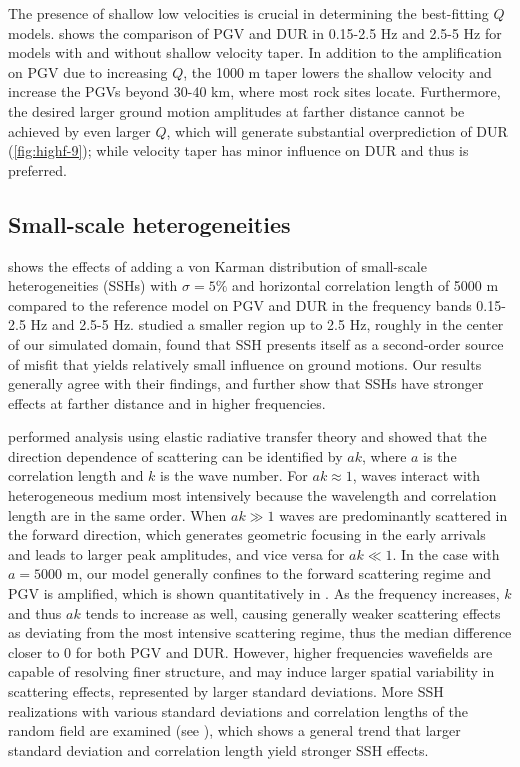 The presence of shallow low velocities is crucial in determining the best-fitting $Q$ models.  shows the comparison of PGV and DUR in 0.15-2.5 Hz and 2.5-5 Hz for models with and without shallow velocity taper. In addition to the amplification on PGV due to increasing $Q$, the 1000 m taper lowers the shallow velocity and increase the PGVs beyond 30-40 km, where most rock sites locate. Furthermore, the desired larger ground motion amplitudes at farther distance cannot be achieved by even larger $Q$, which will generate substantial overprediction of DUR (\cref{fig:highf-9}); while velocity taper has minor influence on DUR and thus is preferred.

\subsection{Small-scale heterogeneities}
 shows the effects of adding a von Karman distribution of small-scale heterogeneities (SSHs) with $\sigma = 5\%$ and horizontal correlation length of 5000 m compared to the reference model on PGV and DUR in the frequency bands 0.15-2.5 Hz and 2.5-5 Hz. \citet{savranGroundMotionSimulation2019} studied a smaller region up to 2.5 Hz, roughly in the center of our simulated domain, found that SSH presents itself as a second-order source of misfit that yields relatively small influence on ground motions. Our results generally agree with their findings, and further show that SSHs have stronger effects at farther distance and in higher frequencies.

\citet{przybillaEstimationCrustalScattering2009} performed analysis using elastic radiative transfer theory and showed that the direction dependence of scattering can be identified by $ak$, where $a$ is the correlation length and $k$ is the wave number. For $ak \approx 1$, waves interact with heterogeneous medium most intensively because the wavelength and correlation length are in the same order. When $ak\gg 1$ waves are predominantly scattered in the forward direction, which generates geometric focusing in the early arrivals and leads to larger peak amplitudes, and vice versa for $ak \ll 1$. In the case with $a=5000$ m, our model generally confines to the forward scattering regime and PGV is amplified, which is shown quantitatively in . As the frequency increases, $k$ and thus $ak$ tends to increase as well, causing generally weaker scattering effects as deviating from the most intensive scattering regime, thus the median difference closer to 0 for both PGV and DUR. However, higher frequencies wavefields are capable of resolving finer structure, and may induce larger spatial variability in scattering effects, represented by larger standard deviations. More SSH realizations with various standard deviations and correlation lengths of the random field are examined (see ), which shows a general trend that larger standard deviation and correlation length yield stronger SSH effects.


